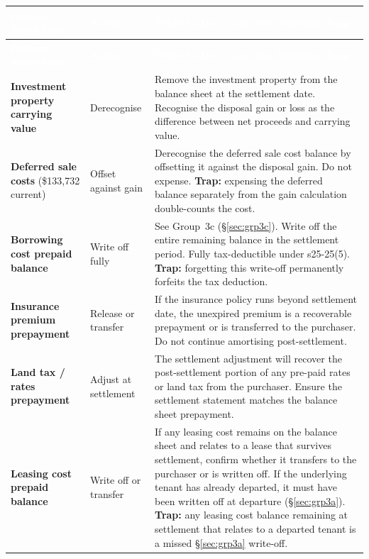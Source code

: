 \documentclass[10pt,a4paper]{article}
\begin{document}
{\small\sffamily
\begin{longtable}{@{} L{3.2cm} L{1.8cm} L{7.7cm} @{}}
\textcolor{white}{\bfseries Balance Sheet Item} & \textcolor{white}{\bfseries Action} & \textcolor{white}{\bfseries What to Do --- and the Omission Trap} \\
\midrule
\endfirsthead
{}\textcolor{white}{\bfseries Balance Sheet Item} & \textcolor{white}{\bfseries Action} & \textcolor{white}{\bfseries What to Do --- and the Omission Trap} \\
\midrule
\endhead
\textbf{Investment property carrying value} & Derecognise & Remove the investment property from the balance sheet at the settlement date. Recognise the disposal gain or loss as the difference between net proceeds and carrying value. \\
\textbf{Deferred sale costs} (\$133,732 current) & Offset against gain & Derecognise the deferred sale cost balance by offsetting it against the disposal gain. Do not expense. \textbf{Trap:} expensing the deferred balance separately from the gain calculation double-counts the cost. \\
\textbf{Borrowing cost prepaid balance} & Write off fully & See Group~3c (\S\ref{sec:grp3c}). Write off the entire remaining balance in the settlement period. Fully tax-deductible under s25-25(5). \textbf{Trap:} forgetting this write-off permanently forfeits the tax deduction. \\
\textbf{Insurance premium prepayment} & Release or transfer & If the insurance policy runs beyond settlement date, the unexpired premium is a recoverable prepayment or is transferred to the purchaser. Do not continue amortising post-settlement. \\
\textbf{Land tax / rates prepayment} & Adjust at settlement & The settlement adjustment will recover the post-settlement portion of any pre-paid rates or land tax from the purchaser. Ensure the settlement statement matches the balance sheet prepayment. \\
\textbf{Leasing cost prepaid balance} & Write off or transfer & If any leasing cost remains on the balance sheet and relates to a lease that survives settlement, confirm whether it transfers to the purchaser or is written off. If the underlying tenant has already departed, it must have been written off at departure (\S\ref{sec:grp3a}). \textbf{Trap:} any leasing cost balance remaining at settlement that relates to a departed tenant is a missed \S\ref{sec:grp3a} write-off. \\

\end{longtable}}
\end{document}
